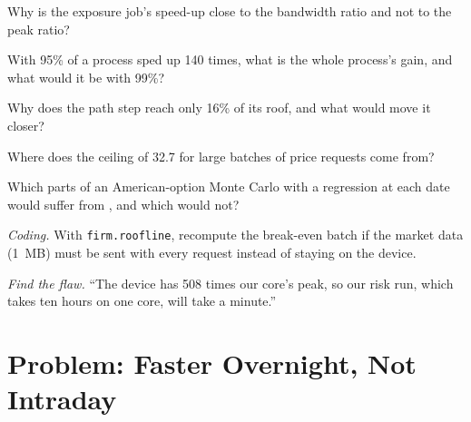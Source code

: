 \begin{exercise}[$\star$]\label{exo:pl:accelerators-for-quantitative-work:2}
Why is the exposure job's speed-up close to the bandwidth ratio and not to the peak ratio?
\end{exercise}

\begin{exercise}[$\star$]\label{exo:pl:accelerators-for-quantitative-work:3}
With 95\% of a process sped up 140 times, what is the whole process's gain, and what would it be with 99\%?
\end{exercise}

\begin{exercise}[$\star\star$]\label{exo:pl:accelerators-for-quantitative-work:4}
Why does the path step reach only 16\% of its roof, and what would move it closer?
\end{exercise}

\begin{exercise}[$\star\star$]\label{exo:pl:accelerators-for-quantitative-work:5}
Where does the ceiling of 32.7 for large batches of price requests come from?
\end{exercise}

\begin{exercise}[$\star\star$]\label{exo:pl:accelerators-for-quantitative-work:6}
Which parts of an American-option Monte Carlo with a regression at each date would suffer from , and which would not?
\end{exercise}

\begin{exercise}[$\star\star\star$]\label{exo:pl:accelerators-for-quantitative-work:7}
\emph{Coding.} With \texttt{firm.roofline}, recompute the break-even batch if the market data (1~MB) must be sent with every request instead
of staying on the device.
\end{exercise}

\begin{exercise}[$\star\star\star$]\label{exo:pl:accelerators-for-quantitative-work:8}
\emph{Find the flaw.} ``The device has 508 times our core's peak, so our risk run, which takes ten hours on one core, will take a minute.''
\end{exercise}

\section{Problem: Faster Overnight, Not Intraday}

